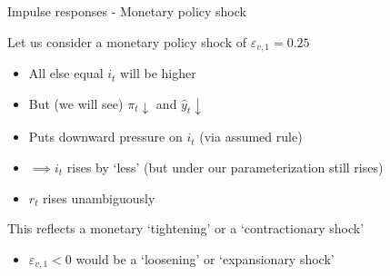 \documentclass{beamer}
\begin{document}
\begin{frame}{Impulse responses - Monetary policy shock}

Let us consider a monetary policy shock of $\varepsilon_{v,1}=0.25$
\begin{itemize}
\item	All else equal $i_{t}$ will be higher
\item	But (we will see) $\pi_{t} \downarrow$ and $\hat{y}_{t} \downarrow$
\item	Puts downward pressure on $i_{t}$ (via assumed rule)
\item	$\implies i_{t}$ rises by `less' (but under our parameterization still rises)
\item	$r_{t}$ rises unambiguously
\end{itemize}

\vspace{2mm}
This reflects a monetary `tightening' or a `contractionary shock'
\begin{itemize}
\item	 $\varepsilon_{v,1}<0$ would be a `loosening' or `expansionary shock'
\end{itemize}

\end{frame}

%
%	
%
%
%
%
\end{document}
